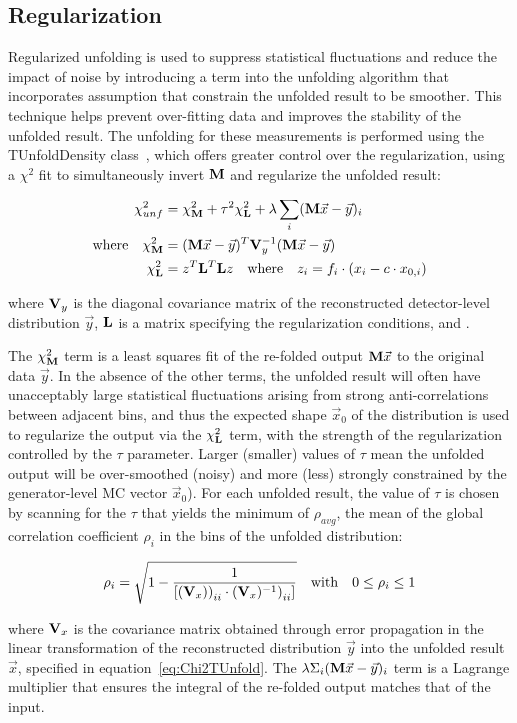 \subsection{Regularization}
\label{Regularization}
Regularized unfolding is used to suppress statistical fluctuations and reduce the impact of noise by introducing a term into the unfolding algorithm that incorporates assumption that constrain the unfolded result to be smoother.
This technique helps prevent over-fitting data and improves the stability of the unfolded result.
The unfolding for these measurements is performed using the TUnfoldDensity class~\cite{TUnfold}, which offers greater control over the regularization, using a $\chi^{2}$ fit to simultaneously invert $\mathbf{M}$ and regularize the unfolded result:
\begin{linenomath*}
\begin{align}
\chi^{2}_{unf}&=\chi^{2}_{\mathbf{M}}+\tau^{2}\chi^{2}_{\mathbf{L}}+\lambda\sum_{i}(\mathbf{M}\vec{x}-\vec{y})_{i} \\
\mathrm{where \quad} \chi^{2}_{\mathbf{M}}&=(\mathbf{M}\vec{x}-\vec{y})^{T}\mathbf{V}_{y}^{-1}(\mathbf{M}\vec{x}-\vec{y}) \\
\chi^{2}_{\mathbf{L}}&={z}^{T}\mathbf{L}^{T}\mathbf{L}{z} \quad \text{where} \quad z_i = f_i \cdot (x_i - c \cdot x_{0,i})
\label{eq:Chi2TUnfold}
\end{align}
\end{linenomath*}
where $\mathbf{V}_{y}$ is the diagonal covariance matrix of the reconstructed detector-level distribution $\vec{y}$, $\mathbf{L}$ is a matrix specifying the regularization conditions, and .

The $\chi^{2}_{\mathbf{M}}$ term is a least squares fit of the re-folded output $\mathbf{M}\vec{x}$ to the original data $\vec{y}$.
In the absence of the other terms, the unfolded result will often have unacceptably large statistical fluctuations arising from strong anti-correlations between adjacent bins, and thus the expected shape $\vec{x}_{0}$ of the distribution is used to regularize the output via the $\chi^{2}_{\mathbf{L}}$ term, with the strength of the regularization controlled by the $\tau$ parameter. 
Larger (smaller) values of $\tau$ mean the unfolded output will be over-smoothed (noisy) and more (less) strongly constrained by the generator-level MC vector $\vec{x}_{0}$).
For each unfolded result, the value of $\tau$ is chosen by scanning for the $\tau$ that yields the minimum of $\rho_{avg}$, the mean of the global correlation coefficient $\rho_{i}$ in the bins of the unfolded distribution:
\begin{linenomath*}
\begin{align}
\rho_{i} = \sqrt{1 - \frac{1}{[{(\mathbf{V}_{x}))}_{ii} \cdot {(\mathbf{V}_{x})^{-1})}_{ii}]}} \quad \text{with} \quad 0 \leq \rho_{i} \leq 1
\end{align}
\end{linenomath*}
where $\mathbf{V}_{x}$ is the covariance matrix obtained through error propagation in the linear transformation of the reconstructed distribution $\vec{y}$ into the unfolded result $\vec{x}$, specified in equation~\ref{eq:Chi2TUnfold}.
The $\lambda\Sigma_{i}(\mathbf{M}\vec{x}-\vec{y})_{i}$ term is a Lagrange multiplier that ensures the integral of the re-folded output matches that of the input.

